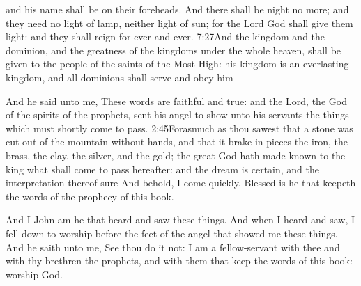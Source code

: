  and his name shall be on their foreheads. 
And there shall be night no more; and they need no light of lamp, neither light of sun; for the Lord God shall give them light:%
 and they shall reign for ever and ever.%
					{7:27}{And the kingdom and the dominion, and the greatness of the kingdoms under the whole heaven, shall be given to the people of the saints of the Most High: his kingdom is an everlasting kingdom, and all dominions shall serve and obey him} %

And he said unto me, These words are faithful and true: and the Lord, the God of the spirits of the prophets, sent his angel to show unto his servants the things which must shortly come to pass.%
			{2:45}{Forasmuch as thou sawest that a stone was cut out of the mountain without hands, and that it brake in pieces the iron, the brass, the clay, the silver, and the gold; the great God hath made known to the king what shall come to pass hereafter: and the dream is certain, and the interpretation thereof sure}
And behold, I come quickly.%
 Blessed is he that keepeth the words of the prophecy of this book.

And I John am he that heard and saw these things. And when I heard and saw, I fell down to worship before the feet of the angel that showed me these things. 
And he saith unto me, See thou do it not: I am a fellow-servant with thee and with thy brethren the prophets, and with them that keep the words of this book: worship God.

